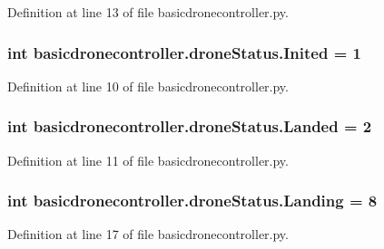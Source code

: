 Definition at line 13 of file basicdronecontroller.\-py.

\hypertarget{classbasicdronecontroller_1_1droneStatus_a863d58782e3420a6d75708af2918cd62}{
\subsubsection[{Inited}]{\setlength{\rightskip}{0pt plus 5cm}int basicdronecontroller.\-drone\-Status.\-Inited = 1\hspace{0.3cm}{\ttfamily [static]}}}\label{classbasicdronecontroller_1_1droneStatus_a863d58782e3420a6d75708af2918cd62}


Definition at line 10 of file basicdronecontroller.\-py.

\hypertarget{classbasicdronecontroller_1_1droneStatus_a000dd254bab4b0e9b269b3890e3332c3}{
\subsubsection[{Landed}]{\setlength{\rightskip}{0pt plus 5cm}int basicdronecontroller.\-drone\-Status.\-Landed = 2\hspace{0.3cm}{\ttfamily [static]}}}\label{classbasicdronecontroller_1_1droneStatus_a000dd254bab4b0e9b269b3890e3332c3}


Definition at line 11 of file basicdronecontroller.\-py.

\hypertarget{classbasicdronecontroller_1_1droneStatus_a81c1b21b3a885042dc0eabf2dfb8366e}{
\subsubsection[{Landing}]{\setlength{\rightskip}{0pt plus 5cm}int basicdronecontroller.\-drone\-Status.\-Landing = 8\hspace{0.3cm}{\ttfamily [static]}}}\label{classbasicdronecontroller_1_1droneStatus_a81c1b21b3a885042dc0eabf2dfb8366e}


Definition at line 17 of file basicdronecontroller.\-py.

